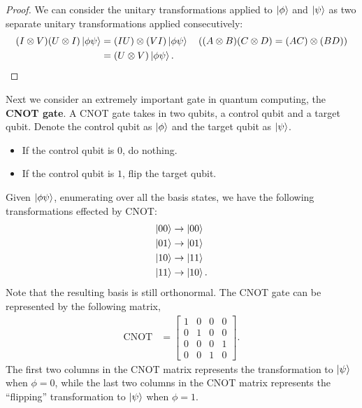 \begin{proof}
    We can consider the unitary transformations applied to $\ket{\phi}$ and $\ket{\psi}$ as two separate unitary transformations applied consecutively:
    \begin{align*}
        (I \otimes V)(U \otimes I) \ket{\phi\psi} &= (IU) \otimes (VI) \ket{\phi\psi} \quad ((A \otimes B)(C \otimes D) = (AC) \otimes (BD)) \\
        &= (U \otimes V) \ket{\phi\psi}.
    \end{align*}
\end{proof}

Next we consider an extremely important gate in quantum computing, the \textbf{CNOT gate}. A CNOT gate takes in two qubits, a control qubit and a target qubit.
Denote the control qubit as $\ket{\phi}$ and the target qubit as $\ket{\psi}$.
\begin{itemize}
    \item If the control qubit is $0$, do nothing.
    \item If the control qubit is $1$, flip the target qubit.
\end{itemize}
Given $\ket{\phi\psi}$, enumerating over all the basis states, we have the following transformations effected by CNOT:
\begin{align*}
    \ket{00} &\rightarrow \ket{00} \\
    \ket{01} &\rightarrow \ket{01} \\
    \ket{10} &\rightarrow \ket{11} \\
    \ket{11} &\rightarrow \ket{10}.
\end{align*}
Note that the resulting basis is still orthonormal. The CNOT gate can be represented by the following matrix,
\begin{align*}
    \text{CNOT} &= \begin{bmatrix}
        1 & 0 & 0 & 0 \\
        0 & 1 & 0 & 0 \\
        0 & 0 & 0 & 1 \\
        0 & 0 & 1 & 0
    \end{bmatrix}.
\end{align*}
The first two columns in the CNOT matrix represents the transformation to $\ket{\psi}$ when $\phi = 0$,
while the last two columns in the CNOT matrix represents the ``flipping'' transformation to $\ket{\psi}$ when $\phi = 1$.

